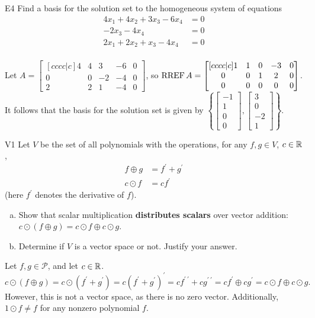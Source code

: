\documentclass{sbgLAexam}
\begin{document}
\begin{problem}{E4}
Find a basis for the solution set to the homogeneous system of equations
\begin{align*}
4x_1+4x_2+3x_3-6x_4 &= 0 \\
-2x_3-4x_4 &= 0 \\
2x_1+2x_2+x_3-4x_4 &= 0 \\
\end{align*}
\end{problem}
\begin{solution}
Let \(A =
  \begin{bmatrix}[cccc|c]
    4 & 4 & 3 & -6 & 0 \\
    0 & 0 & -2 & -4 & 0 \\
    2 & 2 & 1 & -4 & 0
  \end{bmatrix}
\), so \(\operatorname{RREF} A =
  \begin{bmatrix}[cccc|c]
    1 & 1 & 0 & -3 & 0 \\
    0 & 0 & 1 & 2 & 0 \\
    0 & 0 & 0 & 0 & 0
  \end{bmatrix}
\).
It follows that the basis for the solution set is given by \(\left\{
  \begin{bmatrix}
    -1 \\
    1 \\
    0 \\
    0
  \end{bmatrix},
  \begin{bmatrix}
    3 \\
    0 \\
    -2 \\
    1
  \end{bmatrix}
\right\}\).
\end{solution}

\begin{extract}\newpage\end{extract}
\begin{problem}{V1}
Let $V$ be the set of all polynomials with the operations, for any $f, g \in V$, $c \in \mathbb{R}$,
\begin{align*}
f \oplus g &= f^\prime + g^\prime \\
c \odot f &= c f^\prime
\end{align*}
(here $f^\prime$ denotes the derivative of $f$).
\begin{enumerate}[(a)]
\item Show that scalar multiplication \textbf{distributes scalars} over
      vector addition:
      \(c\odot(f \oplus g)=
      c\odot f \oplus c\odot g\).
\item Determine if $V$ is a vector space or not.  Justify your answer.
\end{enumerate}
\end{problem}
\begin{solution}
Let $f,g \in \mathcal{P}$, and let $c \in \mathbb{R}$.
$$c \odot (f \oplus g) = c \odot (f^\prime+g^\prime) =
c(f^\prime+g^\prime)^\prime = cf^{\prime\ \prime}+cg^{\prime\ \prime} =
cf^\prime\oplus cg^\prime= c \odot f \oplus c \odot g.$$
However, this is not a vector space, as there is no zero vector.  Additionally, $1 \odot f \neq f$ for any nonzero polynomial $f$.
\end{solution}
\end{document}
